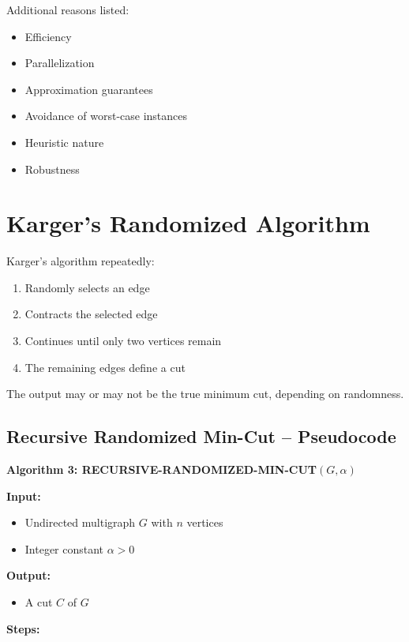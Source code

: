 \documentclass[12pt]{article}
\begin{document}
Additional reasons listed:
\begin{itemize}
    \item Efficiency
    \item Parallelization
    \item Approximation guarantees
    \item Avoidance of worst-case instances
    \item Heuristic nature
    \item Robustness
\end{itemize}

\section{Karger’s Randomized Algorithm}

Karger’s algorithm repeatedly:
\begin{enumerate}
    \item Randomly selects an edge
    \item Contracts the selected edge
    \item Continues until only two vertices remain
    \item The remaining edges define a cut
\end{enumerate}

The output may or may not be the true minimum cut, depending on randomness.

\subsection{Recursive Randomized Min-Cut – Pseudocode}

\textbf{Algorithm 3: RECURSIVE-RANDOMIZED-MIN-CUT$(G, \alpha)$}

\textbf{Input:}
\begin{itemize}
    \item Undirected multigraph $G$ with $n$ vertices
    \item Integer constant $\alpha > 0$
\end{itemize}

\textbf{Output:}
\begin{itemize}
    \item A cut $C$ of $G$
\end{itemize}

\textbf{Steps:}
\end{document}
